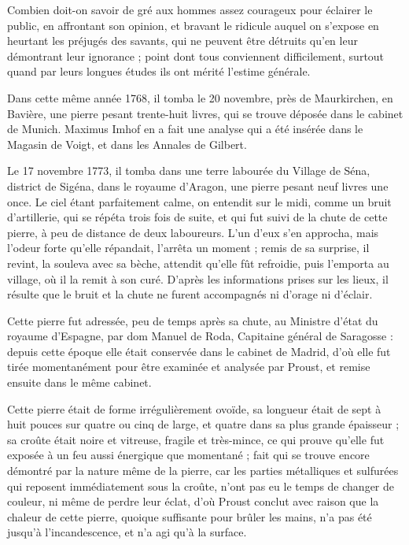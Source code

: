 \documentclass[a4paper, 12pt, oneside, french]{article}
\begin{document}
Combien doit-on savoir de gré aux hommes assez courageux pour éclairer le public, en affrontant son opinion, et bravant le ridicule auquel on s'expose en heurtant les préjugés des savants, qui ne peuvent être détruits qu'en leur démontrant leur ignorance ; point dont tous conviennent difficilement, surtout quand par leurs longues études ils ont mérité l'estime générale.

Dans cette même année 1768, il tomba le 20 novembre, près de Maurkirchen, en Bavière, une pierre pesant trente-huit livres, qui se trouve déposée dans le cabinet de Munich. Maximus Imhof en a fait une analyse qui a été insérée dans le Magasin de Voigt, et dans les Annales de Gilbert.

Le 17 novembre 1773, il tomba dans une terre labourée du Village de Séna, district de Sigéna, dans le royaume d'Aragon, une pierre pesant neuf livres une once. Le ciel étant parfaitement calme, on entendit sur le midi, comme un bruit d'artillerie, qui se répéta trois fois de suite, et qui fut suivi de la chute de cette pierre, à peu de distance de deux laboureurs. L'un d'eux s'en approcha, mais l'odeur forte qu'elle répandait, l'arrêta un moment ; remis de sa surprise, il revint, la souleva avec sa bèche, attendit qu'elle fût refroidie, puis l'emporta au village, où il la remit à son curé. D'après les informations prises sur les lieux, il résulte que le bruit et la chute ne furent accompagnés ni d'orage ni d'éclair.

Cette pierre fut adressée, peu de temps après sa chute, au Ministre d'état du royaume d'Espagne, par dom Manuel de Roda, Capitaine général de Saragosse : depuis cette époque elle était conservée dans le cabinet de Madrid, d'où elle fut tirée momentanément pour être examinée et analysée par Proust, et remise ensuite dans le même cabinet.

Cette pierre était de forme irrégulièrement ovoïde, sa longueur était de sept à huit pouces sur quatre ou cinq de large, et quatre dans sa plus grande épaisseur ; sa croûte était noire et vitreuse, fragile et très-mince, ce qui prouve qu'elle fut exposée à un feu aussi énergique que momentané ; fait qui se trouve encore démontré par la nature même de la pierre, car les parties métalliques et sulfurées qui reposent immédiatement sous la croûte, n'ont pas eu le temps de changer de couleur, ni même de perdre leur éclat, d'où Proust conclut avec raison que la chaleur de cette pierre, quoique suffisante pour brûler les mains, n'a pas été jusqu'à l'incandescence, et n'a agi qu'à la surface.
\end{document}
